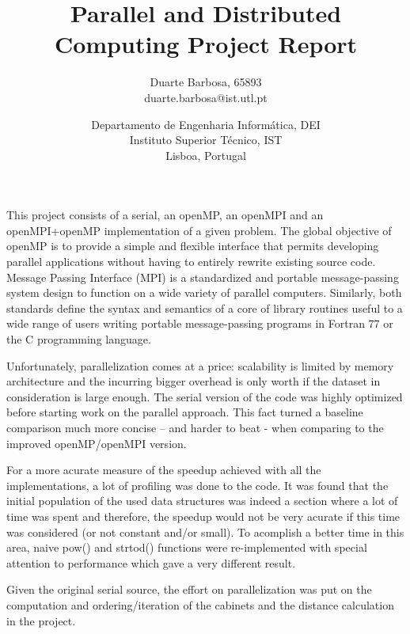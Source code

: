 \documentclass[times, 10pt,twocolumn]{article}
\begin{document}
\title{Parallel and Distributed Computing Project Report}

\author{
Duarte Barbosa, 65893\\
duarte.barbosa@ist.utl.pt\\
\and
Departamento de Engenharia Informática, DEI\\
Instituto Superior Técnico, IST\\
Lisboa, Portugal\\
}

\maketitle
\thispagestyle{empty}

This project consists of a serial, an openMP, an openMPI and an openMPI+openMP implementation of a given problem. The global objective of openMP is to provide a simple and flexible interface that permits developing parallel applications without having to entirely rewrite existing source code. Message Passing Interface (MPI) is a standardized and portable message-passing system design to function on a wide variety of parallel computers. Similarly, both standards define the syntax and semantics of a core of library routines useful to a wide range of users writing portable message-passing programs in Fortran 77 or the C programming language.

Unfortunately, parallelization comes at a price: scalability is limited by memory architecture and the incurring bigger overhead is only worth if the dataset in consideration is large enough. The serial version of the code was highly optimized before starting work on the parallel approach. This fact turned a baseline comparison much more concise – and harder to beat - when comparing to the improved openMP/openMPI version.

For a more acurate measure of the speedup achieved with all the implementations, a lot of profiling was done to the code. It was found that the initial population of the used data structures was indeed a section where a lot of time was spent and therefore, the speedup would not be very acurate if this time was considered (or not constant and/or small). To acomplish a better time in this area, naive pow() and strtod() functions were re-implemented with special attention to performance which gave a very different result.

Given the original serial source, the effort on parallelization was put on the computation and ordering/iteration of the cabinets and the distance calculation in the project.
\end{document}
